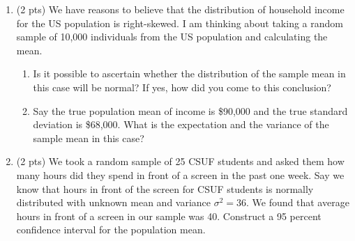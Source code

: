 \documentclass{./../../Latex/handout}
\begin{document}
\begin{enumerate}
\item (2 pts) We have reasons to believe that the distribution of household income
for the US population is right-skewed. I am thinking about
taking a random sample of 10,000 individuals from the US population
and calculating the mean.
\begin{enumerate}
  \item Is it possible to ascertain whether the distribution of the sample mean in this case will be normal? If yes, how did you come to this conclusion?
\item Say the true population mean of income is \$90,000 and the true standard
deviation is \$68,000. What is the expectation and the variance of the sample mean in this case? \\
\end{enumerate}


\item (2 pts) We took a random sample of 25 CSUF students and asked them how many hours did they spend in front of a screen in the past one week. Say we know that hours in front of the screen for CSUF students is normally distributed with unknown mean and variance $\sigma^2 = 36$.  We found that average hours in front of a screen in our sample was 40. Construct a 95 percent confidence interval for the population mean. \\

\end{enumerate}
\end{document}
